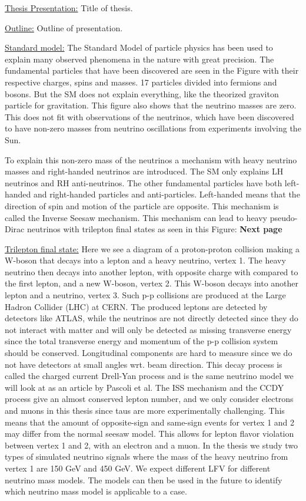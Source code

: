 \documentclass[a4paper, american, 12pt]{report}
\begin{document}
	\underline{Thesis Presentation:}
	Title of thesis.
	
	
	\underline{Outline:}
	Outline of presentation.
	
	
	\underline{Standard model:}
	The Standard Model of particle physics has been used to explain many observed phenomena in the nature with great precision. The fundamental particles that have been discovered are seen in the Figure with their respective charges, spins and masses. 17 particles divided into fermions and bosons. But the SM does not explain everything, like the theorized graviton particle for gravitation. This figure also shows that the neutrino masses are zero. This does not fit with observations of the neutrinos, which have been discovered to have non-zero masses from neutrino oscillations from experiments involving the Sun.
	
	To explain this non-zero mass of the neutrinos a mechanism with heavy neutrino masses and right-handed neutrinos are introduced. The SM only explains LH neutrinos and RH anti-neutrinos. The other fundamental particles have both left-handed and right-handed particles and anti-particles. Left-handed means that the direction of spin and motion of the particle are opposite. This mechanism is called the Inverse Seesaw mechanism. This mechanism can lead to heavy pseudo-Dirac neutrinos with trilepton final states as seen in this Figure: \textbf{Next page}
	
	
	\underline{Trilepton final state:}
	Here we see a diagram of a proton-proton collision making a W-boson that decays into a lepton and a heavy neutrino, vertex 1. The heavy neutrino then decays into another lepton, with opposite charge with compared to the first lepton, and a new W-boson, vertex 2. This W-boson decays into another lepton and a neutrino, vertex 3. Such p-p collisions are produced at the Large Hadron Collider (LHC) at CERN. The produced leptons are detected by detectors like ATLAS, while the neutrinos are not directly detected since they do not interact with matter and will only be detected as missing transverse energy since the total transverse energy and momentum of the p-p collision system should be conserved. Longitudinal components are hard to measure since we do not have detectors at small angles wrt. beam direction. This decay process is called the charged current Drell-Yan process and is the same neutrino model we will look at as an article by Pascoli et al. The ISS mechanism and the CCDY process give an almost conserved lepton number, and we only consider electrons and muons in this thesis since taus are more experimentally challenging. This means that the amount of opposite-sign and same-sign events for vertex 1 and 2 may differ from the normal seesaw model. This allows for lepton flavor violation between vertex 1 and 2, with an electron and a muon. In the thesis we study two types of simulated neutrino signals where the mass of the heavy neutrino from vertex 1 are 150 GeV and 450 GeV. We expect different LFV for different neutrino mass models. The models can then be used in the future to identify which neutrino mass model is applicable to a case.
	
\end{document}
